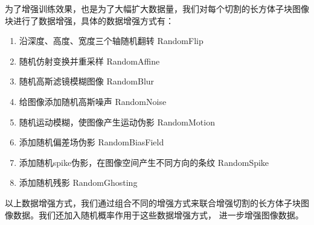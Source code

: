 为了增强训练效果，也是为了大幅扩大数据量，我们对每个切割的长方体子块图像块进行了数据增强，具体的数据增强方式有：
\begin{enumerate}\label{enum:data_augmentation}
    \item {\heiti 沿深度、高度、宽度三个轴随机翻转 RandomFlip}
    \item {\heiti 随机仿射变换并重采样 RandomAffine}
    \item {\heiti 随机高斯滤镜模糊图像 RandomBlur}
    \item {\heiti 给图像添加随机高斯噪声 RandomNoise}
    \item {\heiti 随机运动模糊，使图像产生运动伪影 RandomMotion}
    \item {\heiti 添加随机偏差场伪影 RandomBiasField}
    \item {\heiti 添加随机spike伪影，在图像空间产生不同方向的条纹 RandomSpike}
    \item {\heiti 添加随机残影 RandomGhosting}
\end{enumerate}
以上数据增强方式，我们通过组合不同的增强方式来联合增强切割的长方体子块图像数据。我们还加入随机概率作用于这些数据增强方式，
进一步增强图像数据。


